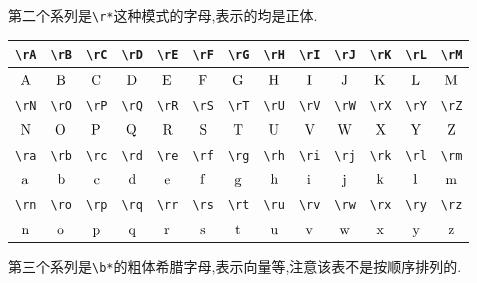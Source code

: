 \documentclass[lang=cn,12pt,scheme=chinese,mode=simple,black]{elegantbook}
\begin{document}
\vspace{1cm}

第二个系列是\verb|\r*|这种模式的字母,表示的均是正体.

\begin{center}
\renewcommand{\arraystretch}{1.4}
\setlength{\tabcolsep}{6pt}
\begin{tabular}{|c|c|c|c|c|c|c|c|c|c|c|c|c|}
\hline\hline
\verb|\rA| & \verb|\rB| & \verb|\rC| & \verb|\rD| & \verb|\rE| & \verb|\rF| & \verb|\rG| & \verb|\rH| & \verb|\rI| & \verb|\rJ| & \verb|\rK| & \verb|\rL| & \verb|\rM|\\
\hline
$\rA$ & $\rB$ & $\rC$ & $\rD$ & $\rE$ & $\rF$ & $\rG$ & $\rH$ & $\rI$ & $\rJ$ & $\rK$ & $\rL$ & $\rM$\\
\hline\hline
\verb|\rN| & \verb|\rO| & \verb|\rP| & \verb|\rQ| & \verb|\rR| & \verb|\rS| & \verb|\rT| & \verb|\rU| & \verb|\rV| & \verb|\rW| & \verb|\rX| & \verb|\rY| & \verb|\rZ|\\
\hline
$\rN$ & $\rO$ & $\rP$ & $\rQ$ & $\rR$ & $\rS$ & $\rT$ & $\rU$ & $\rV$ & $\rW$ & $\rX$ & $\rY$ & $\rZ$\\
\hline\hline
\verb|\ra| & \verb|\rb| & \verb|\rc| & \verb|\rd| & \verb|\re| & \verb|\rf| & \verb|\rg| & \verb|\rh| & \verb|\ri| & \verb|\rj| & \verb|\rk| & \verb|\rl| & \verb|\rm|\\
\hline
$\ra$ & $\rb$ & $\rc$ & $\rd$ & $\re$ & $\rf$ & $\rg$ & $\rh$ & $\ri$ & $\rj$ & $\rk$ & $\rl$ & $\rm$\\
\hline\hline
\verb|\rn| & \verb|\ro| & \verb|\rp| & \verb|\rq| & \verb|\rr| & \verb|\rs| & \verb|\rt| & \verb|\ru| & \verb|\rv| & \verb|\rw| & \verb|\rx| & \verb|\ry| & \verb|\rz|\\
\hline
$\rn$ & $\ro$ & $\rp$ & $\rq$ & $\rr$ & $\rs$ & $\rt$ & $\ru$ & $\rv$ & $\rw$ & $\rx$ & $\ry$ & $\rz$\\
\hline\hline
\end{tabular}
\end{center}

\vspace{1cm}
\newpage
第三个系列是\verb|\b*|的粗体希腊字母,表示向量等,注意该表不是按顺序排列的.
\end{document}

